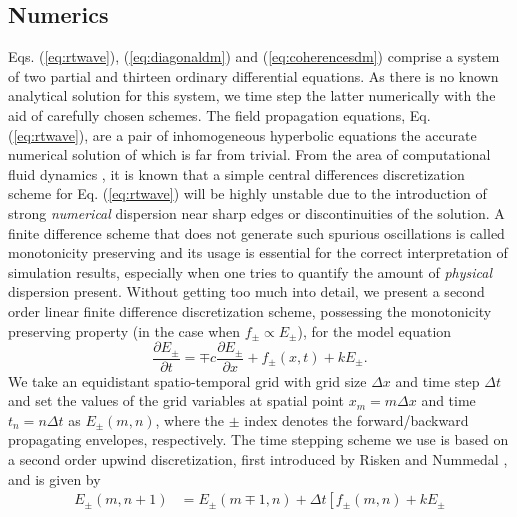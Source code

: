 \documentclass[10pt,letterpaper]{article}%
\begin{document}
\begin{appendices}%

\section{Numerics}

\label{sec:numerics} Eqs. (\ref{eq:rtwave}), (\ref{eq:diagonaldm}) and
(\ref{eq:coherencesdm}) comprise a system of two partial and thirteen ordinary
differential equations. As there is no known analytical solution for this
system, we time step the latter numerically with the aid of carefully chosen
schemes. The field propagation equations, Eq. (\ref{eq:rtwave}), are a pair of
inhomogeneous hyperbolic equations the accurate numerical solution of which is
far from trivial. From the area of computational fluid dynamics
\cite{wesseling2009principles}, it is known that a simple central differences
discretization scheme for Eq. (\ref{eq:rtwave}) will be highly unstable due to
the introduction of strong \emph{numerical} dispersion near sharp edges or
discontinuities of the solution. A finite difference scheme that does not
generate such spurious oscillations is called monotonicity preserving
\cite{wesseling2009principles} and its usage is essential for the correct
interpretation of simulation results, especially when one tries to quantify
the amount of \emph{physical} dispersion present. Without getting too much
into detail, we present a second order linear finite difference discretization
scheme, possessing the monotonicity preserving property (in the case when
$f_{\pm}\propto E_{\pm}$), for the model equation
\begin{equation}
\frac{\partial E_{\pm}}{\partial t}=\mp c\frac{\partial E_{\pm}}{\partial
x}+f_{\pm}(x,t)+kE_{\pm}.\label{eq:genericwave}%
\end{equation}
We take an equidistant spatio-temporal grid with grid size $\Delta x$ and time
step $\Delta t$ and set the values of the grid variables at spatial point
$x_{m}=m\Delta x$ and time $t_{n}=n\Delta t$ as $E_{\pm}(m,n)$, where the
$\pm$ index denotes the forward/backward propagating envelopes, respectively.
The time stepping scheme we use is based on a second order upwind
discretization, first introduced by Risken and Nummedal \cite{risken1968self},
and is given by
\begin{align}
E_{\pm}(m,n+1) &  =E_{\pm}(m\mp1,n)+\Delta t\left[  f_{\pm}(m,n)+kE_{\pm
}
\end{align}
\end{appendices}
\end{document}
